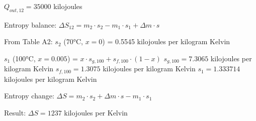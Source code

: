 \( Q_{out,12} = 35000 \) kilojoules  

Entropy balance:  
\( \Delta S_{12} = m_2 \cdot s_2 - m_1 \cdot s_1 + \Delta m \cdot s \)  

From Table A2:  
\( s_2 \) (70°C, \( x = 0 \)) = 0.5545 kilojoules per kilogram Kelvin  

\( s_1 \) (100°C, \( x = 0.005 \)) = \( x \cdot s_{g,100} + s_{f,100} \cdot (1 - x) \)  
\( s_{g,100} = 7.3065 \) kilojoules per kilogram Kelvin  
\( s_{f,100} = 1.3075 \) kilojoules per kilogram Kelvin  
\( s_1 = 1.333714 \) kilojoules per kilogram Kelvin  

Entropy change:  
\( \Delta S = m_2 \cdot s_2 + \Delta m \cdot s - m_1 \cdot s_1 \)  

Result:  
\( \Delta S = 1237 \) kilojoules per Kelvin